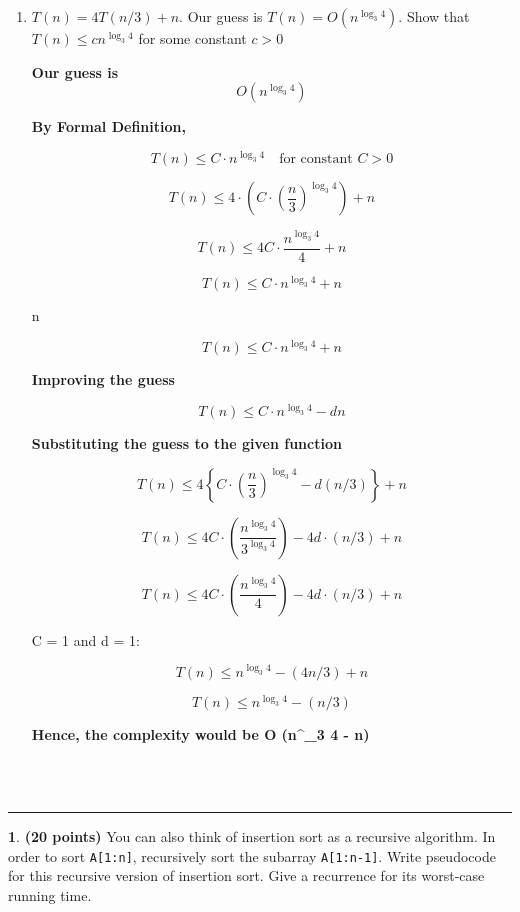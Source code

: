 \documentclass[11pt]{article}
\def\code#1{\texttt{#1}}
\newcommand{\finishproblem}{
    \vspace{10pt}
    \hrule
    \vspace{10pt}
}
\newcommand{\bracket}[1]{\ensuremath{\left\{ {#1} \right\}}}
\theoremstyle{definition}
\newtheorem{prob}{}
\newcommand{\solution}{\medskip\noindent{\color{DarkBlue}\textbf{Solution:}}}
\begin{document}
\begin{enumerate}[label=(b)]
\item $T(n)= 4T(n/3) + n$. Our guess is $T(n) = O(n^{\log_3 4})$. Show that $T(n) \le cn^{\log_3 4}$ for some constant $c > 0$\\
\solution

\textbf{Our guess is} \[ O(n^{\log_3 4}) \]

\textbf{By Formal Definition,}

\[
T(n) \leq C \cdot n^{\log_3 4} \quad \text{for constant } C > 0
\]

\[
T(n) \leq 4 \cdot \left( C \cdot \left( \frac{n}{3} \right)^{\log_3 4} \right) + n
\]

\[
T(n) \leq 4C \cdot \frac{n^{\log_3 4}}{4} + n
\]

\[
T(n) \leq C \cdot n^{\log_3 4} + n
\]

 n 

\[
T(n) \leq C \cdot n^{\log_3 4} + n
\]


\textbf{Improving the guess}

\[
T(n) \leq C \cdot n^{\log_3 4} - d n
\]

\textbf{Substituting the guess to the given function}

\[
T(n) \leq 4 \bracket{ C \cdot \left(\frac{n}{3}\right)^{\log_3 4} - d (n/3) }+ n
\]

\[
T(n) \leq 4C \cdot \left(\frac{n^{\log_3 4}}{3^{\log_3 4}}\right) - 4 d \cdot (n/3) + n
\]

\[
T(n) \leq 4C \cdot \left(\frac{n^{\log_3 4}}{4}\right) - 4d \cdot (n/3) + n
\]

 C = 1 and d = 1:

\[
T(n) \leq n^{\log_3 4} - (4n/3) + n
\]

\[
T(n) \leq n^{\log_3 4} - (n/3)
\]

\textbf{Hence, the complexity would be O (n^{\log_3 4} - n)}

\end{enumerate}

\\
\\
\finishproblem
\begin{prob} \textbf{(20 points)} You can also think of insertion sort as a recursive algorithm. In order to sort \code{A[1:n]}, recursively sort the subarray \code{A[1:n-1]}. Write pseudocode for this recursive version of insertion sort. Give a recurrence for its worst-case running time.
\end{prob}
\solution
\end{document}
